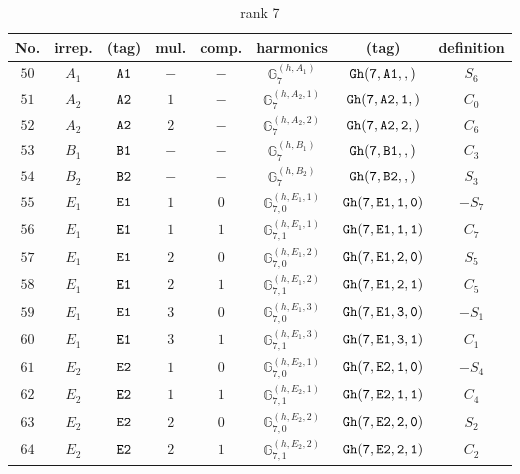 \documentclass[fleqn,8pt]{jsarticle}
\begin{document}
\begin{table}[ht!]
\begin{center}
\caption{rank 7}
\renewcommand{\arraystretch}{1.3}
\begin{tabular}{cccccccc} \hline \hline
No. & irrep. & (tag) & mul. & comp. & harmonics & (tag) & definition \\ \hline
$ 50 $ & $ A_{1} $ & $ {\tt A1} $ & $ - $ & $ - $ & $ \mathbb{G}_{7}^{(h,A_{1})} $ & $ {\tt Gh(7,A1,,)} $ & $ S_{6} $ \\
$ 51 $ & $ A_{2} $ & $ {\tt A2} $ & $ 1 $ & $ - $ & $ \mathbb{G}_{7}^{(h,A_{2},1)} $ & $ {\tt Gh(7,A2,1,)} $ & $ C_{0} $ \\
$ 52 $ & $ A_{2} $ & $ {\tt A2} $ & $ 2 $ & $ - $ & $ \mathbb{G}_{7}^{(h,A_{2},2)} $ & $ {\tt Gh(7,A2,2,)} $ & $ C_{6} $ \\
$ 53 $ & $ B_{1} $ & $ {\tt B1} $ & $ - $ & $ - $ & $ \mathbb{G}_{7}^{(h,B_{1})} $ & $ {\tt Gh(7,B1,,)} $ & $ C_{3} $ \\
$ 54 $ & $ B_{2} $ & $ {\tt B2} $ & $ - $ & $ - $ & $ \mathbb{G}_{7}^{(h,B_{2})} $ & $ {\tt Gh(7,B2,,)} $ & $ S_{3} $ \\
$ 55 $ & $ E_{1} $ & $ {\tt E1} $ & $ 1 $ & $ 0 $ & $ \mathbb{G}_{7,0}^{(h,E_{1},1)} $ & $ {\tt Gh(7,E1,1,0)} $ & $ - S_{7} $ \\
$ 56 $ & $ E_{1} $ & $ {\tt E1} $ & $ 1 $ & $ 1 $ & $ \mathbb{G}_{7,1}^{(h,E_{1},1)} $ & $ {\tt Gh(7,E1,1,1)} $ & $ C_{7} $ \\
$ 57 $ & $ E_{1} $ & $ {\tt E1} $ & $ 2 $ & $ 0 $ & $ \mathbb{G}_{7,0}^{(h,E_{1},2)} $ & $ {\tt Gh(7,E1,2,0)} $ & $ S_{5} $ \\
$ 58 $ & $ E_{1} $ & $ {\tt E1} $ & $ 2 $ & $ 1 $ & $ \mathbb{G}_{7,1}^{(h,E_{1},2)} $ & $ {\tt Gh(7,E1,2,1)} $ & $ C_{5} $ \\
$ 59 $ & $ E_{1} $ & $ {\tt E1} $ & $ 3 $ & $ 0 $ & $ \mathbb{G}_{7,0}^{(h,E_{1},3)} $ & $ {\tt Gh(7,E1,3,0)} $ & $ - S_{1} $ \\
$ 60 $ & $ E_{1} $ & $ {\tt E1} $ & $ 3 $ & $ 1 $ & $ \mathbb{G}_{7,1}^{(h,E_{1},3)} $ & $ {\tt Gh(7,E1,3,1)} $ & $ C_{1} $ \\
$ 61 $ & $ E_{2} $ & $ {\tt E2} $ & $ 1 $ & $ 0 $ & $ \mathbb{G}_{7,0}^{(h,E_{2},1)} $ & $ {\tt Gh(7,E2,1,0)} $ & $ - S_{4} $ \\
$ 62 $ & $ E_{2} $ & $ {\tt E2} $ & $ 1 $ & $ 1 $ & $ \mathbb{G}_{7,1}^{(h,E_{2},1)} $ & $ {\tt Gh(7,E2,1,1)} $ & $ C_{4} $ \\
$ 63 $ & $ E_{2} $ & $ {\tt E2} $ & $ 2 $ & $ 0 $ & $ \mathbb{G}_{7,0}^{(h,E_{2},2)} $ & $ {\tt Gh(7,E2,2,0)} $ & $ S_{2} $ \\
$ 64 $ & $ E_{2} $ & $ {\tt E2} $ & $ 2 $ & $ 1 $ & $ \mathbb{G}_{7,1}^{(h,E_{2},2)} $ & $ {\tt Gh(7,E2,2,1)} $ & $ C_{2} $ \\
 \hline \hline
\end{tabular}
\end{center}
\end{table}
\end{document}
